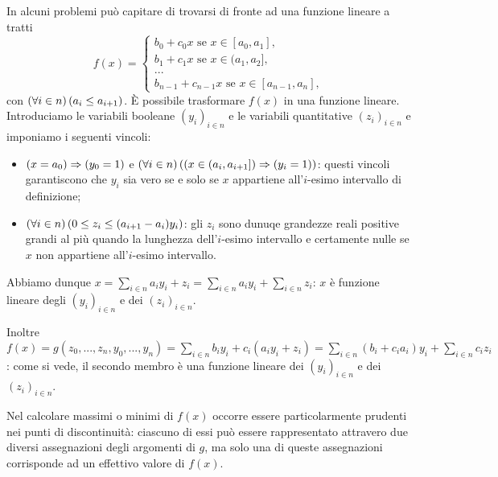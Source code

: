 \begin{Example}
	In alcuni problemi pu\`o capitare di trovarsi di fronte ad una funzione lineare a tratti
	$$f(x) = \begin{cases}
	b_0 + c_0x\text{ se }x \in [a_0,a_1],\\
	b_1 + c_1x\text{ se }x \in (a_1,a_2],\\
	...\\
	b_{n - 1} + c_{n - 1}x\text{ se }x \in [a_{n - 1},a_n],
	\end{cases}$$
	con $\left ( \forall i \in n \right ) \left ( a_i \leq a_{i + 1} \right )$.
	\`E possibile trasformare $f(x)$ in una funzione lineare. Introduciamo le variabili booleane $(y_i)_{i \in n}$ e le variabili quantitative $(z_i)_{i \in n}$ e imponiamo i seguenti vincoli:
	\begin{itemize}
		\item $\left ( x = a_0 \right ) \Rightarrow \left ( y_0 = 1 \right )$ e $\left ( \forall i \in n \right ) \left ( \left ( x \in (a_i,a_{i + 1}] \right ) \Rightarrow \left ( y_i = 1 \right ) \right )$: questi vincoli garantiscono che $y_i$ sia vero se e solo se $x$ appartiene all'$i$-esimo intervallo di definizione;
		\item $\left ( \forall i \in n \right ) \left ( 0 \leq z_i \leq (a_{i + 1} - a_i)y_i \right )$: gli $z_i$ sono dunuqe grandezze reali positive grandi al pi\`u quando la lunghezza dell'$i$-esimo intervallo e certamente nulle se $x$ non appartiene all'$i$-esimo intervallo.
	\end{itemize}
	\par Abbiamo dunque $x = \sum_{i \in n}{a_iy_i + z_i} = \sum_{i \in n}{a_iy_i} + \sum_{i \in n} z_i$: $x$ \`e funzione lineare degli $(y_i)_{i \in n}$ e dei $(z_i)_{i \in n}$.
	\par Inoltre $f(x) = g(z_0,...,z_n,y_0,...,y_n) = \sum_{i \in n}b_iy_i + c_i(a_iy_i + z_i) = \sum_{i \in n}(b_i + c_ia_i)y_i + \sum_{i \in n}{c_iz_i}$: come si vede, il secondo membro \`e una funzione lineare dei $(y_i)_{i \in n}$ e dei $(z_i)_{i \in n}$.
	\par Nel calcolare massimi o minimi di $f(x)$ occorre essere particolarmente prudenti nei punti di discontinuit\`a: ciascuno di essi pu\`o essere rappresentato attravero due diversi assegnazioni degli argomenti di $g$, ma solo una di queste assegnazioni corrisponde ad un effettivo valore di $f(x)$.
\end{Example}
